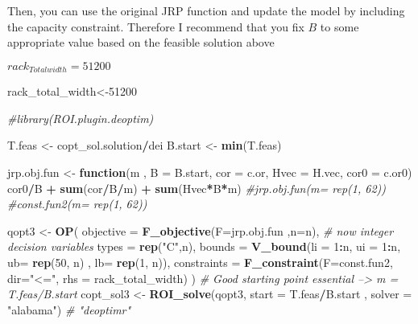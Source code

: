 \documentclass[
]{article}
\newenvironment{Shaded}{\begin{snugshade}}{\end{snugshade}}
\newcommand{\CommentTok}[1]{\textcolor[rgb]{0.56,0.35,0.01}{\textit{#1}}}
\newcommand{\ControlFlowTok}[1]{\textcolor[rgb]{0.13,0.29,0.53}{\textbf{#1}}}
\newcommand{\DataTypeTok}[1]{\textcolor[rgb]{0.13,0.29,0.53}{#1}}
\newcommand{\DecValTok}[1]{\textcolor[rgb]{0.00,0.00,0.81}{#1}}
\newcommand{\KeywordTok}[1]{\textcolor[rgb]{0.13,0.29,0.53}{\textbf{#1}}}
\newcommand{\NormalTok}[1]{#1}
\newcommand{\OperatorTok}[1]{\textcolor[rgb]{0.81,0.36,0.00}{\textbf{#1}}}
\newcommand{\StringTok}[1]{\textcolor[rgb]{0.31,0.60,0.02}{#1}}
\begin{document}
Then, you can use the original JRP function and update the model by
including the capacity constraint. Therefore I recommend that you fix
\(B\) to some appropriate value based on the feasible solution above

\(rack_{Totalwidth}=51200\)

\begin{Shaded}
\begin{Highlighting}[]
\NormalTok{rack_total_width<-}\DecValTok{51200}

\CommentTok{#library(ROI.plugin.deoptim)}

\NormalTok{T.feas <-}\StringTok{ }\NormalTok{copt_sol.solution}\OperatorTok{/}\NormalTok{dei}
\NormalTok{B.start <-}\StringTok{ }\KeywordTok{min}\NormalTok{(T.feas)}

\NormalTok{jrp.obj.fun <-}\StringTok{ }\ControlFlowTok{function}\NormalTok{(m , }\DataTypeTok{B =}\NormalTok{ B.start, }\DataTypeTok{cor =}\NormalTok{ c.or, }\DataTypeTok{Hvec =}\NormalTok{ H.vec, }\DataTypeTok{cor0 =}\NormalTok{ c.or0) cor0}\OperatorTok{/}\NormalTok{B }\OperatorTok{+}\StringTok{ }\KeywordTok{sum}\NormalTok{(cor}\OperatorTok{/}\NormalTok{B}\OperatorTok{/}\NormalTok{m) }\OperatorTok{+}\StringTok{ }\KeywordTok{sum}\NormalTok{(Hvec}\OperatorTok{*}\NormalTok{B}\OperatorTok{*}\NormalTok{m)}
\CommentTok{#jrp.obj.fun(m= rep(1, 62))}
\CommentTok{#const.fun2(m= rep(1, 62))}

\NormalTok{qopt3 <-}\StringTok{ }\KeywordTok{OP}\NormalTok{(}
  \DataTypeTok{objective =} \KeywordTok{F_objective}\NormalTok{(}\DataTypeTok{F=}\NormalTok{jrp.obj.fun ,}\DataTypeTok{n=}\NormalTok{n),}
  \CommentTok{# now integer decision variables}
  \DataTypeTok{types =} \KeywordTok{rep}\NormalTok{(}\StringTok{"C"}\NormalTok{,n),}
  \DataTypeTok{bounds =} \KeywordTok{V_bound}\NormalTok{(}\DataTypeTok{li =} \DecValTok{1}\OperatorTok{:}\NormalTok{n, }\DataTypeTok{ui =} \DecValTok{1}\OperatorTok{:}\NormalTok{n, }\DataTypeTok{ub=} \KeywordTok{rep}\NormalTok{(}\DecValTok{50}\NormalTok{, n) , }\DataTypeTok{lb=} \KeywordTok{rep}\NormalTok{(}\DecValTok{1}\NormalTok{, n)),}
  \DataTypeTok{constraints =} \KeywordTok{F_constraint}\NormalTok{(}\DataTypeTok{F=}\NormalTok{const.fun2,}
                             \DataTypeTok{dir=}\StringTok{"<="}\NormalTok{,}
                             \DataTypeTok{rhs =}\NormalTok{ rack_total_width)}
\NormalTok{)}
\CommentTok{# Good starting point essential --> m = T.feas/B.start}
\NormalTok{copt_sol3 <-}\StringTok{ }\KeywordTok{ROI_solve}\NormalTok{(qopt3, }\DataTypeTok{start =}\NormalTok{ T.feas}\OperatorTok{/}\NormalTok{B.start , }\DataTypeTok{solver =} \StringTok{"alabama"}\NormalTok{)  }\CommentTok{# "deoptimr"}


\end{Highlighting}
\end{Shaded}
\end{document}
